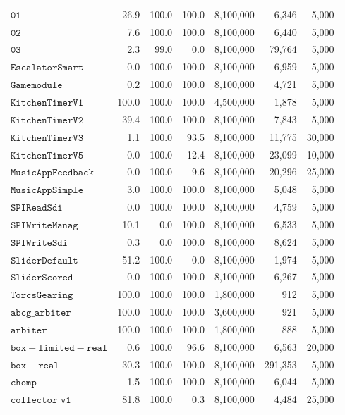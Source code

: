\begin{small}
\begin{longtable}{p{5cm}|rrr|rrr}
$\mathtt{01}$ & 26.9 & 100.0 & 100.0 & 8,100,000 & 6,346 & 5,000 \\
$\mathtt{02}$ & 7.6 & 100.0 & 100.0 & 8,100,000 & 6,440 & 5,000 \\
$\mathtt{03}$ & 2.3 & 99.0 & 0.0 & 8,100,000 & 79,764 & 5,000 \\
$\mathtt{EscalatorSmart}$ & 0.0 & 100.0 & 100.0 & 8,100,000 & 6,959 & 5,000 \\
$\mathtt{Gamemodule}$ & 0.2 & 100.0 & 100.0 & 8,100,000 & 4,721 & 5,000 \\
$\mathtt{KitchenTimerV1}$ & 100.0 & 100.0 & 100.0 & 4,500,000 & 1,878 & 5,000 \\
$\mathtt{KitchenTimerV2}$ & 39.4 & 100.0 & 100.0 & 8,100,000 & 7,843 & 5,000 \\
$\mathtt{KitchenTimerV3}$ & 1.1 & 100.0 & 93.5 & 8,100,000 & 11,775 & 30,000 \\
$\mathtt{KitchenTimerV5}$ & 0.0 & 100.0 & 12.4 & 8,100,000 & 23,099 & 10,000 \\
$\mathtt{MusicAppFeedback}$ & 0.0 & 100.0 & 9.6 & 8,100,000 & 20,296 & 25,000 \\
$\mathtt{MusicAppSimple}$ & 3.0 & 100.0 & 100.0 & 8,100,000 & 5,048 & 5,000 \\
$\mathtt{SPIReadSdi}$ & 0.0 & 100.0 & 100.0 & 8,100,000 & 4,759 & 5,000 \\
$\mathtt{SPIWriteManag}$ & 10.1 & 0.0 & 100.0 & 8,100,000 & 6,533 & 5,000 \\
$\mathtt{SPIWriteSdi}$ & 0.3 & 0.0 & 100.0 & 8,100,000 & 8,624 & 5,000 \\
$\mathtt{SliderDefault}$ & 51.2 & 100.0 & 0.0 & 8,100,000 & 1,974 & 5,000 \\
$\mathtt{SliderScored}$ & 0.0 & 100.0 & 100.0 & 8,100,000 & 6,267 & 5,000 \\
$\mathtt{TorcsGearing}$ & 100.0 & 100.0 & 100.0 & 1,800,000 & 912 & 5,000 \\
$\mathtt{abcg\_arbiter}$ & 100.0 & 100.0 & 100.0 & 3,600,000 & 921 & 5,000 \\
$\mathtt{arbiter}$ & 100.0 & 100.0 & 100.0 & 1,800,000 & 888 & 5,000 \\
$\mathtt{box-limited-real}$ & 0.6 & 100.0 & 96.6 & 8,100,000 & 6,563 & 20,000 \\
$\mathtt{box-real}$ & 30.3 & 100.0 & 100.0 & 8,100,000 & 291,353 & 5,000 \\
$\mathtt{chomp}$ & 1.5 & 100.0 & 100.0 & 8,100,000 & 6,044 & 5,000 \\
$\mathtt{collector\_v1}$ & 81.8 & 100.0 & 0.3 & 8,100,000 & 4,484 & 25,000 \\

\end{longtable}
\end{small}
